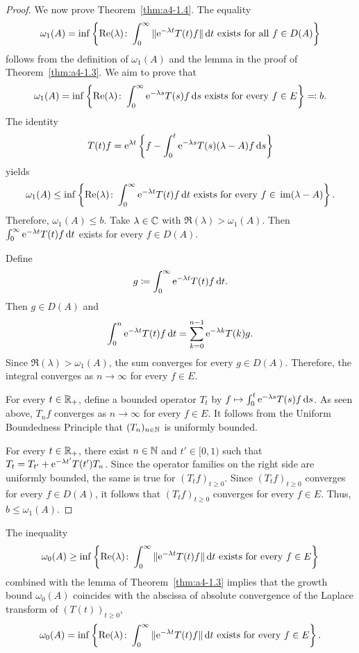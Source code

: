 \begin{proof}
We now prove Theorem~\ref{thm:a4-1.4}.
The equality 
 \[ 
 \omega_1(A) = \inf \left\{ \mathop{}\!\mathrm{Re}(\lambda)\colon\int_0^\infty \|\mathrm{e}^{-\lambda t} T(t) f \|  \mathop{}\!\mathrm{d}{t} \text{ exists for all } f \in D(A) \right\} 
 \] 
 follows from the definition of\/ $\omega_1(A)$ and the lemma in the proof of Theorem~\ref{thm:a4-1.3}.
We aim to prove that
\[
\omega_1(A) = \inf \left\{ \mathop{}\!\mathrm{Re}(\lambda)\colon\int_0^\infty \mathrm{e}^{-\lambda s} T(s) f  \mathop{}\!\mathrm{d}{s} \text{ exists for every } f \in E \right\} \eqqcolon  b. 
\]
The identity
\[
    T(t) f = \mathrm{e}^{\lambda t} \left\{ f - \int_0^{t} \mathrm{e}^{-\lambda s} T(s) (\lambda - A) f  \mathop{}\!\mathrm{d}{s} \right\}
\]
yields
\[
\omega_1(A) \leq \inf \left\{ \Re(\lambda)\colon\int_0^\infty \eu^{-\lambda t} T(t) f  \dt \text{ exists for every } f \in \Image{\lambda - A} \right\}.
\]
Therefore, $\omega_1(A) \leq b$.
Take $\lambda \in \mathbb{C}$ with $\Re(\lambda) > \omega_1(A)$. 
Then $\int_0^\infty \mathrm{e}^{-\lambda t} T(t) f  \mathop{}\!\mathrm{d}{t}$ exists for every $f \in D(A)$. 

Define 
%
\[
	g \coloneq  \int_0^\infty \mathrm{e}^{-\lambda t} T(t) f  \mathop{}\!\mathrm{d}{t} .
\]
%
Then $g \in D(A)$ and
%
\[
	 \int_0^n \mathrm{e}^{-\lambda t} T(t) f  \mathop{}\!\mathrm{d}{t} = \sum_{k=0}^{n-1} \mathrm{e}^{-\lambda k} T(k) g .
\]
%
Since $\Re(\lambda) > \omega_1(A)$, the sum converges for every $g \in D(A)$. 
Therefore, the integral converges as $n \to \infty$ for every $f \in E$.

For every $t \in \mathbb{R}_+$, define a bounded operator $T_t$ by $ f \mapsto \int_0^t \mathrm{e}^{-\lambda s} T(s) f  \mathop{}\!\mathrm{d}{s}$. 
As seen above, $T_n f$ converges as $n \to \infty$ for every $f \in E$. 
It follows from the Uniform Boundedness Principle that $(T_n)_{n \in \mathbb{N}}$ is uniformly bounded.

For every $t \in \mathbb{R}_+$, there exist $n \in \mathbb{N}$ and $t' \in [0,1)$ such that $T_t = T_{t'} + \mathrm{e}^{-\lambda t'} T(t') T_n$. 
Since the operator families on the right side are uniformly bounded, the same is true for $(T_t f)_{t \geq 0}$. 
Since $(T_t f)_{t \geq 0}$ converges for every $f \in D(A)$, it follows that $(T_t f)_{t \geq 0}$ converges for every $f \in E$. 
Thus, $b \leq \omega_1(A)$.
\end{proof}
%


The inequality
\[
    \omega_{0}(A) \geq \inf \left\{ \Re(\lambda)\colon\int_0^\infty \|\eu^{-\lambda t} T(t) f \|  \dt 
    \text{ exists for every } f \in E \right\}
\]
combined with the lemma of Theorem~\ref{thm:a4-1.3} implies that the growth bound $\omega_{0}(A)$ coincides with the abscissa of absolute convergence of the Laplace transform of\/ $(T(t))_{t \geq 0}$, \ie
\begin{equation}\label{eq:a4-1.6}
   \omega_{0}(A) = \inf \left\{ \mathop{}\!\mathrm{Re}  (\lambda)\colon\int_0^\infty \|\mathrm{e}^{-\lambda t} T(t) f \|  \mathop{}\!\mathrm{d}{t} \text{ exists for every } f \in E \right\}.
\end{equation}
%


